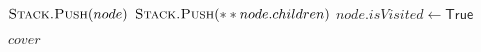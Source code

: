 \begin{questions}
\begin{algorithm}[!htp]
\begin{algorithmic}[1]
            \Else {}

            \State $\Call{Stack.Push}{node}$
            \State $\Call{Stack.Push}{**node.children}$
            \State $node.isVisited \gets \mathsf{True}$

            \EndIf

            \EndWhile

            \State \Return $cover$
        \end{algorithmic}
    \end{algorithm}
\end{questions}
